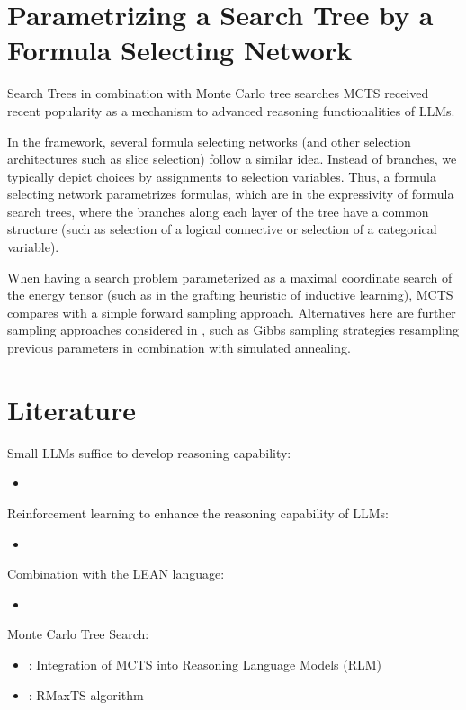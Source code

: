 \documentclass[aps,onecolumn,nofootinbib,pra]{article}
\begin{document}
\section{Parametrizing a Search Tree by a Formula Selecting Network}

Search Trees in combination with Monte Carlo tree searches MCTS received recent popularity as a mechanism to advanced reasoning functionalities of LLMs.

In the \tnreason framework, several formula selecting networks (and other selection architectures such as slice selection) follow a similar idea.
Instead of branches, we typically depict choices by assignments to selection variables.
Thus, a formula selecting network parametrizes formulas, which are in the expressivity of formula search trees, where the branches along each layer of the tree have a common structure (such as selection of a logical connective or selection of a categorical variable).

When having a  search problem parameterized as a maximal coordinate search of the energy tensor (such as in the grafting heuristic of inductive learning), MCTS compares with a simple forward sampling approach.
Alternatives here are further sampling approaches considered in \tnreason, such as Gibbs sampling strategies resampling previous parameters in combination with simulated annealing.


\section{Literature}

Small LLMs suffice to develop reasoning capability:
\begin{itemize}
	\item \cite{guan_rstar-math_2025}
\end{itemize}

Reinforcement learning to enhance the reasoning capability of LLMs:
\begin{itemize}
	\item \cite{deepseek-ai_deepseek-r1_2025}
\end{itemize}

Combination with the LEAN language:
\begin{itemize}
	\item \cite{xin_deepseek-prover-v15_2024}
\end{itemize}

Monte Carlo Tree Search:
\begin{itemize}
	\item \cite{besta_reasoning_2025}: Integration of MCTS into Reasoning Language Models (RLM)
	\item \cite{xin_deepseek-prover-v15_2024}: RMaxTS algorithm
\end{itemize}




\end{document}
